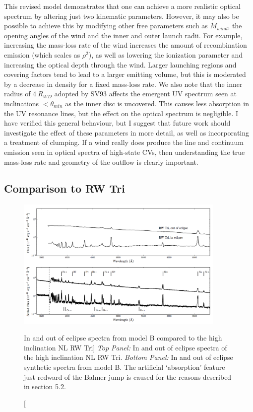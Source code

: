 This revised model demonstrates that one can achieve a more
realistic optical spectrum by altering just two kinematic parameters. 
However, it may also be possible to achieve this by modifying
other free parameters such as $\dot{M}_{wind}$, the opening angles of the wind and the 
inner and outer launch radii. For example, increasing the mass-loss rate of the wind
increases the amount of recombination emission (which scales as $\rho^2$), 
as well as lowering the ionization parameter and increasing the optical depth through the wind. 
Larger launching regions and covering factors tend to lead to a larger emitting volume, 
but this is moderated by a decrease in density 
for a fixed mass-loss rate. We also note that the inner radius of $4~R_{WD}$ adopted by SV93 
affects the emergent UV spectrum seen at inclinations $<\theta_{min}$ as 
the inner disc is uncovered. This causes less absorption in the UV resonance lines,
but the effect on the optical spectrum is negligible.
I have verified this general behaviour, but
I suggest that future work should investigate the effect of these parameters in more detail,
as well as incorporating a treatment of clumping.
If a wind really does produce the line and continuum emission seen in optical spectra of high-state CVs, then
understanding the true mass-loss rate and geometry of the outflow is clearly important.


\subsection{Comparison to RW Tri}

\begin{figure}
\includegraphics[width=0.9\textwidth]{figures/05-cvpaper/fig13.png}
\caption
[In and out of eclipse spectra from model B compared to the high
inclination NL RW Tri]
{{\sl Top Panel:} In and out of eclipse spectra of the high
inclination NL RW Tri. {\sl Bottom Panel:} In and out of eclipse synthetic
spectra from model B.
The artificial `absorption' feature just redward of the Balmer jump
is caused for the reasons described in section 5.2.}
\label{rwtricomp}
\end{figure}


